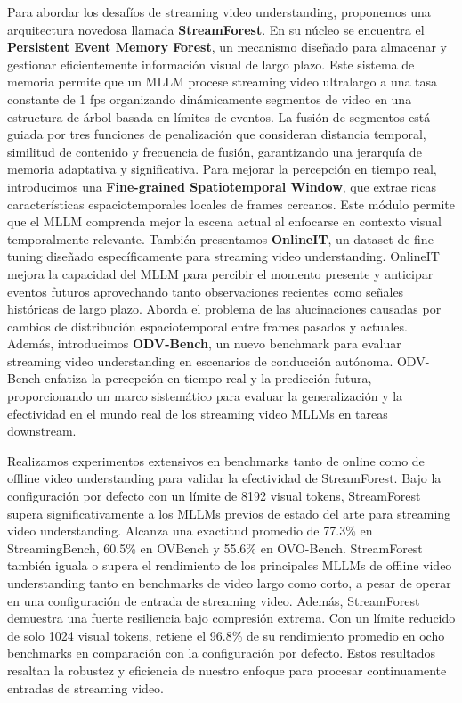 


Para abordar los desafíos de streaming video understanding, proponemos una arquitectura novedosa llamada \textbf{StreamForest}. En su núcleo se encuentra el \textbf{Persistent Event Memory Forest}, un mecanismo diseñado para almacenar y gestionar eficientemente información visual de largo plazo. Este sistema de memoria permite que un MLLM procese streaming video ultralargo a una tasa constante de 1 fps organizando dinámicamente segmentos de video en una estructura de árbol basada en límites de eventos. La fusión de segmentos está guiada por tres funciones de penalización que consideran distancia temporal, similitud de contenido y frecuencia de fusión, garantizando una jerarquía de memoria adaptativa y significativa. Para mejorar la percepción en tiempo real, introducimos una \textbf{Fine-grained Spatiotemporal Window}, que extrae ricas características espaciotemporales locales de frames cercanos. Este módulo permite que el MLLM comprenda mejor la escena actual al enfocarse en contexto visual temporalmente relevante. También presentamos \textbf{OnlineIT}, un dataset de fine-tuning diseñado específicamente para streaming video understanding. OnlineIT mejora la capacidad del MLLM para percibir el momento presente y anticipar eventos futuros aprovechando tanto observaciones recientes como señales históricas de largo plazo. Aborda el problema de las alucinaciones causadas por cambios de distribución espaciotemporal entre frames pasados y actuales. Además, introducimos \textbf{ODV-Bench}, un nuevo benchmark para evaluar streaming video understanding en escenarios de conducción autónoma. ODV-Bench enfatiza la percepción en tiempo real y la predicción futura, proporcionando un marco sistemático para evaluar la generalización y la efectividad en el mundo real de los streaming video MLLMs en tareas downstream.

Realizamos experimentos extensivos en benchmarks tanto de online como de offline video understanding para validar la efectividad de StreamForest. Bajo la configuración por defecto con un límite de 8192 visual tokens, StreamForest supera significativamente a los MLLMs previos de estado del arte para streaming video understanding. Alcanza una exactitud promedio de 77.3\% en StreamingBench, 60.5\% en OVBench y 55.6\% en OVO-Bench. StreamForest también iguala o supera el rendimiento de los principales MLLMs de offline video understanding tanto en benchmarks de video largo como corto, a pesar de operar en una configuración de entrada de streaming video. Además, StreamForest demuestra una fuerte resiliencia bajo compresión extrema. Con un límite reducido de solo 1024 visual tokens, retiene el 96.8\% de su rendimiento promedio en ocho benchmarks en comparación con la configuración por defecto. Estos resultados resaltan la robustez y eficiencia de nuestro enfoque para procesar continuamente entradas de streaming video.
